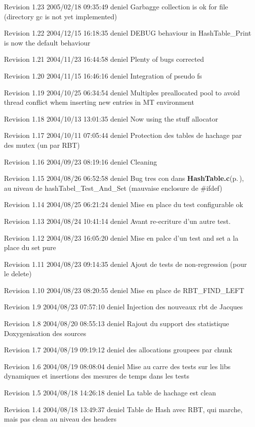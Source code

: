Revision 1.23 2005/02/18 09:35:49 deniel Garbagge collection is ok for file (directory gc is not yet implemented)

Revision 1.22 2004/12/15 16:18:35 deniel DEBUG behaviour in Hash\-Table\_\-Print is now the default behaviour

Revision 1.21 2004/11/23 16:44:58 deniel Plenty of bugs corrected

Revision 1.20 2004/11/15 16:46:16 deniel Integration of pseudo fs

Revision 1.19 2004/10/25 06:34:54 deniel Multiples preallocated pool to avoid thread conflict whem inserting new entries in MT environment

Revision 1.18 2004/10/13 13:01:35 deniel Now using the stuff allocator

Revision 1.17 2004/10/11 07:05:44 deniel Protection des tables de hachage par des mutex (un par RBT)

Revision 1.16 2004/09/23 08:19:16 deniel Cleaning

Revision 1.15 2004/08/26 06:52:58 deniel Bug tres con dans {\bf Hash\-Table.c}{\rm (p.\,\pageref{HashTable_8c})}, au niveau de hash\-Tabel\_\-Test\_\-And\_\-Set (mauvaise enclosure de \#ifdef)

Revision 1.14 2004/08/25 06:21:24 deniel Mise en place du test configurable ok

Revision 1.13 2004/08/24 10:41:14 deniel Avant re-ecriture d'un autre test.

Revision 1.12 2004/08/23 16:05:20 deniel Mise en palce d'un test and set a la place du set pure

Revision 1.11 2004/08/23 09:14:35 deniel Ajout de tests de non-regression (pour le delete)

Revision 1.10 2004/08/23 08:20:55 deniel Mise en place de RBT\_\-FIND\_\-LEFT

Revision 1.9 2004/08/23 07:57:10 deniel Injection des nouveaux rbt de Jacques

Revision 1.8 2004/08/20 08:55:13 deniel Rajout du support des statistique Doxygenisation des sources

Revision 1.7 2004/08/19 09:19:12 deniel des allocations groupees par chunk

Revision 1.6 2004/08/19 08:08:04 deniel Mise au carre des tests sur les libs dynamiques et insertions des mesures de temps dans les tests

Revision 1.5 2004/08/18 14:26:18 deniel La table de hachage est clean

Revision 1.4 2004/08/18 13:49:37 deniel Table de Hash avec RBT, qui marche, mais pas clean au niveau des headers

